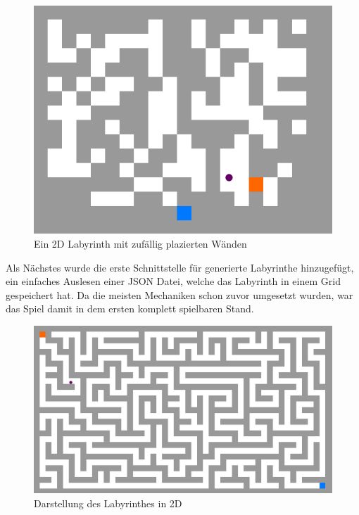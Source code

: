 \begin{figure}[hbtp!]
    \centering
    \includegraphics[width=\paperwidth-6in]{../assets/img/Fr2DTopDownRandom.PNG}
    \caption{Ein 2D Labyrinth mit zufällig plazierten Wänden}
    \label{fig:Fr2DTopDownRandom}
\end{figure}
Als Nächstes wurde die erste Schnittstelle für generierte Labyrinthe hinzugefügt, ein einfaches Auslesen einer JSON Datei, welche das Labyrinth in einem Grid gespeichert hat.
Da die meisten Mechaniken schon zuvor umgesetzt wurden, war das Spiel damit in dem ersten komplett spielbaren Stand.

\begin{figure}[hbtp!]
    \centering
    \includegraphics[width=\paperwidth-3in]{../assets/img/Fr2DTopDown.PNG}
    \caption{Darstellung des Labyrinthes in 2D}
    \label{fig:Fr2DTopDown}
\end{figure}

